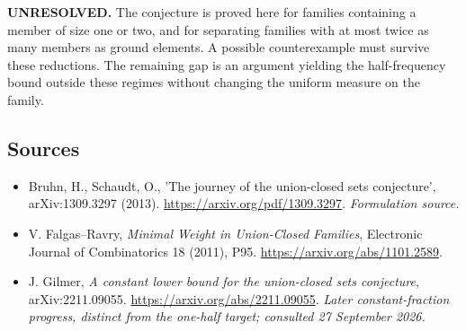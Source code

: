 \documentclass[11pt]{article}
\begin{document}
\textbf{UNRESOLVED.} The conjecture is proved here for families containing a member of size one or two, and for separating families with at most twice as many members as ground elements. A possible counterexample must survive these reductions. The remaining gap is an argument yielding the half-frequency bound outside these regimes without changing the uniform measure on the family.

\subsection{Sources}
\begin{itemize}
\item[S1]Bruhn, H., Schaudt, O., 'The journey of the union-closed sets conjecture', arXiv:1309.3297 (2013).
\url{https://arxiv.org/pdf/1309.3297}.
\textit{Formulation source.}
\item[E1]V. Falgas--Ravry, \emph{Minimal Weight in Union-Closed Families}, Electronic Journal of Combinatorics 18 (2011), P95.
\url{https://arxiv.org/abs/1101.2589}.
\item[E2]J. Gilmer, \emph{A constant lower bound for the union-closed sets conjecture}, arXiv:2211.09055.
\url{https://arxiv.org/abs/2211.09055}.
\textit{Later constant-fraction progress, distinct from the one-half target; consulted 27 September 2026.}
\end{itemize}
\end{document}
